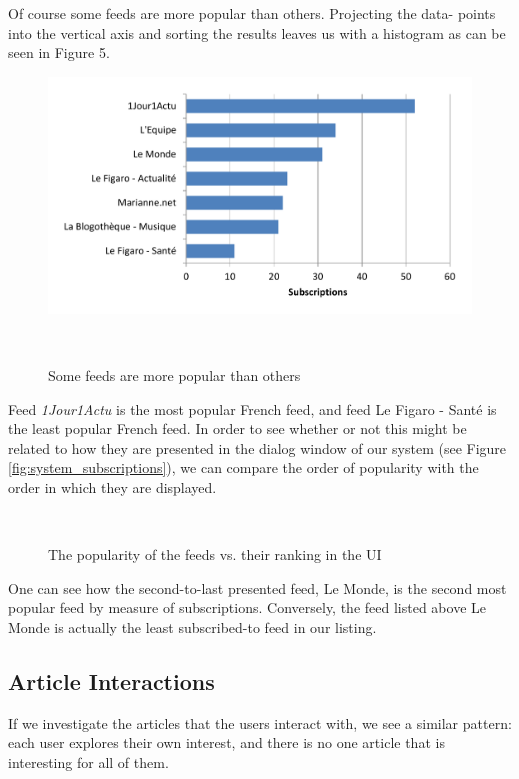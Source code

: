 Of course some feeds are more popular than others. Projecting the data- points into the vertical axis and sorting the results leaves us with a histogram as can be seen in Figure 5.

\begin{figure}[h!]
\centering
  \includegraphics[width=\columnwidth]{figures/feed_popularity}
  \caption{Some feeds are more popular than others}~\label{fig:registrations}
\end{figure}


Feed {\em 1Jour1Actu} is the most popular French feed, and feed Le Figaro - Sant\'e is the least popular French feed. In order to see whether or not this might be related to how they are presented in the dialog window of our system (see Figure \ref{fig:system_subscriptions}), we can compare the order of popularity with the order in which they are displayed.

\begin{figure}[h!]
\centering
  
  \caption{The popularity of the feeds vs. their ranking in the UI}~\label{fig:registrations}
\end{figure}

One can see how the second-to-last presented feed, Le Monde, is the second most popular feed by measure of subscriptions. Conversely, the feed listed above Le Monde is actually the least subscribed-to feed in our listing.



\subsection{Article Interactions}
If we investigate the articles that the users interact with, we see a similar pattern: each user explores their own interest, and there is no one article that is interesting for all of them. 

